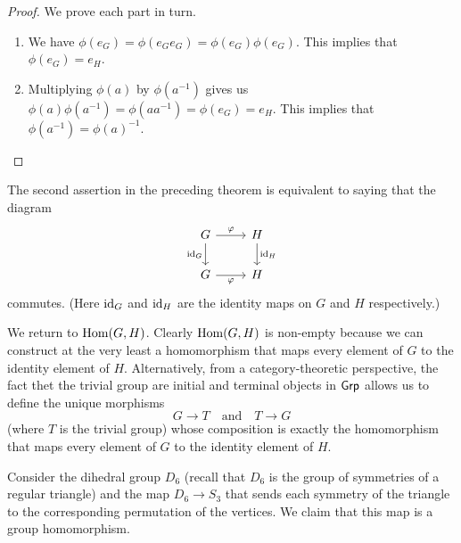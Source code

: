 \begin{proof}
    We prove each part in turn.

    \begin{enumerate}[label=(\alph*), wide]
        \item We have \(\phi(e_G) = \phi(e_G e_G) = \phi(e_G) \phi(e_G)\). This
        implies that \(\phi(e_G) = e_H\).
        \item Multiplying \(\phi(a)\) by \(\phi(a^{-1})\) gives us
        \(\phi(a)\phi(a^{-1}) = \phi(aa^{-1}) = \phi(e_G) = e_H\). This implies
        that \(\phi(a^{-1}) = \phi(a)^{-1}\).
    \end{enumerate}
\end{proof}

\begin{remark}
    The second assertion in the preceding theorem is equivalent to saying that
    the diagram
    \[
        \begin{tikzcd}
            G \arrow{r}{\phi} \arrow[swap]{d}{\id_G} & H \arrow{d}{\id_H} \\
            G \arrow[swap]{r}{\phi} & H
        \end{tikzcd}
    \]
    commutes. (Here \(\operatorname{id}_G\) and \(\operatorname{id}_H\) are the identity maps on \(G\) and
    \(H\) respectively.)
\end{remark}

\begin{example}
    We return to \(\operatorname{Hom}(G, H)\). Clearly \(\operatorname{Hom}(G, H)\) is non-empty because we
    can construct at the very least a homomorphism that maps every element of
    \(G\) to the identity element of \(H\). Alternatively, from a
    category-theoretic perspective, the fact thet the trivial group are initial
    and terminal objects in \(\mathsf{Grp}\) allows us to define the unique morphisms
    \[
        G \to T \quad \text{and} \quad T \to G
    \]
    (where \(T\) is the trivial group) whose composition is exactly the
    homomorphism that maps every element of \(G\) to the identity element of
    \(H\).
\end{example}

\begin{example}
    Consider the dihedral group \(D_6\) (recall that \(D_6\) is the group of
    symmetries of a regular triangle) and the map \(D_6 \to S_3\) that sends
    each symmetry of the triangle to the corresponding permutation of the
    vertices. We claim that this map is a group homomorphism.
\end{example}

